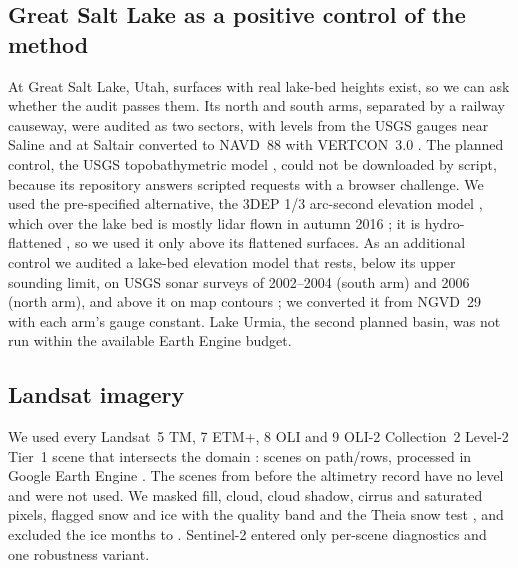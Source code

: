 \subsection{Great Salt Lake as a positive control of the method}
\label{sec:gsl}
At Great Salt Lake, Utah, surfaces with real lake-bed heights exist, so we can ask whether the audit passes them. Its north and south arms, separated by a railway causeway, were audited as two sectors, with levels from the USGS gauges near Saline and at Saltair \citep{usgs_nwis} converted to NAVD~88 with VERTCON~3.0 \citep{noaa_ncat}. The planned control, the USGS topobathymetric model \citep{root2023_gsl_tbdem}, could not be downloaded by script, because its repository answers scripted requests with a browser challenge. We used the pre-specified alternative, the 3DEP 1/3 arc-second elevation model \citep{usgs_3dep10m}, which over the lake bed is mostly lidar flown in autumn 2016 \citep{quantumspatial2017_gsl,usgs_3dep13_tiles}; it is hydro-flattened \citep{archuleta2017}, so we used it only above its flattened surfaces. As an additional control we audited a lake-bed elevation model \citep{tarboton_gsl_bathymetry} that rests, below its upper sounding limit, on USGS sonar surveys of 2002--2004 (south arm) and 2006 (north arm), and above it on map contours \citep{baskin2005,baskin2006}; we converted it from NGVD~29 with each arm's gauge constant. Lake Urmia, the second planned basin, was not run within the available Earth Engine budget.

\subsection{Landsat imagery}
\label{sec:landsat}
We used every Landsat~5 TM, 7 ETM+, 8 OLI and 9 OLI-2 Collection~2 Level-2 Tier~1 scene that intersects the domain \citep{usgs_l45tm_c2l2,usgs_l7etm_c2l2,usgs_l89oli_c2l2}:  scenes on  path/rows, processed in Google Earth Engine \citep{gorelick2017}. The  scenes from before the altimetry record have no level and were not used. We masked fill, cloud, cloud shadow, cirrus and saturated pixels, flagged snow and ice with the quality band and the Theia snow test \citep{gascoin2019}, and excluded the ice months  to . Sentinel-2 entered only per-scene diagnostics and one robustness variant.

